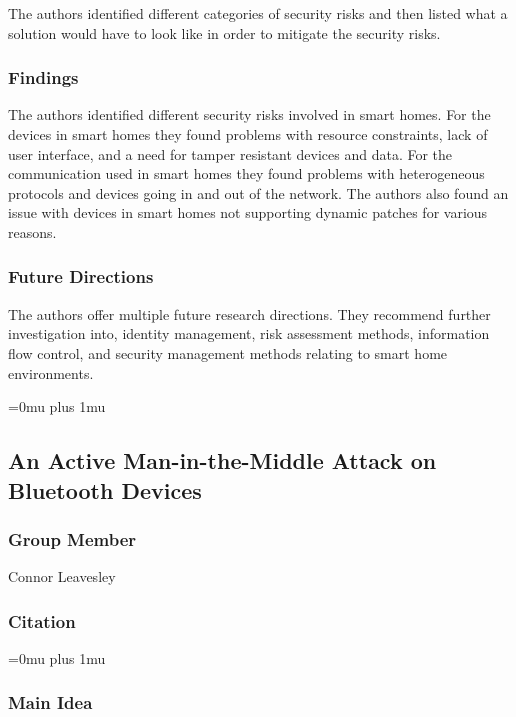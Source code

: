 \noindent
The authors identified different categories of security risks and then listed what a solution would have to look like in order to mitigate the security risks.


\subsubsection{Findings}

\noindent
The authors identified different security risks involved in smart homes. For the devices in smart homes they found problems with resource constraints, lack of user interface, and a need for tamper resistant devices and data. For the communication used in smart homes they found problems with heterogeneous protocols and devices going in and out of the network. The authors also found an issue with devices in smart homes not supporting dynamic patches for various reasons. 

\subsubsection{Future Directions}

\noindent
The authors offer multiple future research directions. They recommend further investigation into, identity management, risk assessment methods, information flow control, and security management methods relating to smart home environments. 

\Urlmuskip=0mu plus 1mu\relax


\noindent
\subsection{An Active Man-in-the-Middle Attack on Bluetooth Devices}

\subsubsection{Group Member}

\noindent
Connor Leavesley

\noindent
\subsubsection{Citation}

\Urlmuskip=0mu plus 1mu\relax

\subsubsection{Main Idea}


